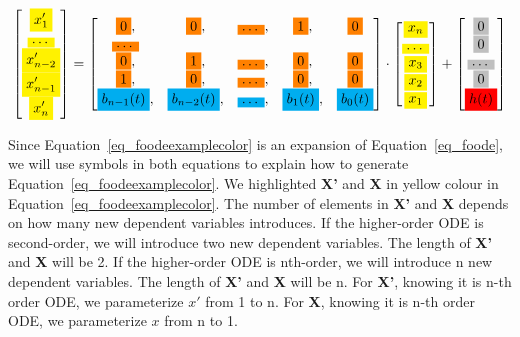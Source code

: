 \begin{equation} \label{eq_foodeexamplecolor}
	\begin{bmatrix}
		\highlight{yellow}{x_{1}'} \\
    \highlight{yellow}{\dots} \\
    \highlight{yellow}{x_{n-2}'} \\
    \highlight{yellow}{x_{n-1}'} \\
    \highlight{yellow}{x_{n}'}
	\end{bmatrix}
    = 
  \begin{bmatrix}
		\highlight{orange}{0}, & \highlight{orange}{0}, & \highlight{orange}{\dots}, & \highlight{orange}{1}, & \highlight{orange}{0} \\
    \highlight{orange}{\dots} \\
    \highlight{orange}{0}, & \highlight{orange}{1}, & \highlight{orange}{\dots}, & \highlight{orange}{0}, & \highlight{orange}{0} \\
    \highlight{orange}{1}, & \highlight{orange}{0}, & \highlight{orange}{\dots}, & \highlight{orange}{0}, & \highlight{orange}{0} \\
    \highlight{cyan}{b_{n-1}(t)}, & \highlight{cyan}{b_{n-2}(t)}, & \highlight{cyan}{\dots}, & \highlight{cyan}{b_{1}(t)}, & \highlight{cyan}{b_{0}(t)}
	\end{bmatrix}
    \cdot
  \begin{bmatrix}
    \highlight{yellow}{x_{n}} \\
    \highlight{yellow}{\dots} \\
    \highlight{yellow}{x_{3}} \\
		\highlight{yellow}{x_{2}} \\
    \highlight{yellow}{x_{1}}
	\end{bmatrix}
    + 
  \begin{bmatrix}
    \highlight{lightgray}{0} \\
    \highlight{lightgray}{0} \\
    \highlight{lightgray}{\dots} \\
    \highlight{lightgray}{0} \\
    \highlight{red}{h(t)}
	\end{bmatrix}
\end{equation}

Since Equation~\ref{eq_foodeexamplecolor} is an expansion of Equation~\ref{eq_foode}, we will use symbols in both equations to explain how to generate Equation~\ref{eq_foodeexamplecolor}. We highlighted \textbf{X'} and \textbf{X} in yellow colour in Equation~\ref{eq_foodeexamplecolor}. The number of elements in \textbf{X'} and \textbf{X} depends on how many new dependent variables introduces. If the higher-order ODE is second-order, we will introduce two new dependent variables. The length of \textbf{X'} and \textbf{X} will be 2. If the higher-order ODE is nth-order, we will introduce n new dependent variables. The length of \textbf{X'} and \textbf{X} will be n. For \textbf{X'}, knowing it is n-th order ODE, we parameterize $x'$ from 1 to n. For \textbf{X}, knowing it is n-th order ODE, we parameterize $x$ from n to 1.

